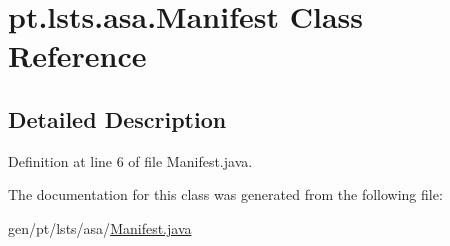 \hypertarget{classpt_1_1lsts_1_1asa_1_1Manifest}{}\section{pt.\+lsts.\+asa.\+Manifest Class Reference}
\label{classpt_1_1lsts_1_1asa_1_1Manifest}


\subsection{Detailed Description}


Definition at line 6 of file Manifest.\+java.



The documentation for this class was generated from the following file\+:\begin{DoxyCompactItemize}
\item 
gen/pt/lsts/asa/\hyperlink{Manifest_8java}{Manifest.\+java}\end{DoxyCompactItemize}
